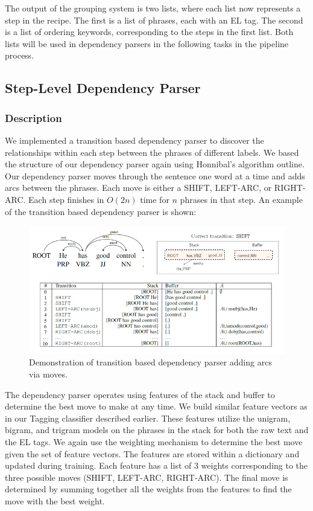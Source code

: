 The output of the grouping system is two lists, where each list now represents a step in the recipe. The first is a list of phrases, each with an EL tag. The second is a list of ordering keywords, corresponding to the steps in the first list. Both lists will be used in dependency parsers in the following tasks in the pipeline process.

\subsection{Step-Level Dependency Parser}

\subsubsection{Description}
We implemented a transition based dependency parser to discover the relationships within each step between the phrases of different labels. We based the structure of our dependency parser again using Honnibal's algorithm outline.\cite{honnibal} Our dependency parser moves through the sentence one word at a time and adds arcs between the phrases. Each move is either a SHIFT, LEFT-ARC, or RIGHT-ARC. Each step finishes in $O(2n)$ time for $n$ phrases in that step. An example of the transition based dependency parser is shown:

\begin{figure}
  \centering
    \includegraphics[width=.5\textwidth]{parser1.png}
  \caption{Demonstration of transition based dependency parser adding arcs via moves. \cite{864}}
\end{figure}

The dependency parser operates using features of the stack and buffer to determine the best move to make at any time. We build similar feature vectors as in our Tagging classifier described earlier. These features utilize the unigram, bigram, and trigram models on the phrases in the stack for both the raw text and the EL tags. We again use the weighting mechanism to determine the best move given the set of feature vectors. The features are stored within a dictionary and updated during training. Each feature has a list of 3 weights corresponding to the three possible moves (SHIFT, LEFT-ARC, RIGHT-ARC). The final move is determined by summing together all the weights from the features to find the move with the best weight. 

